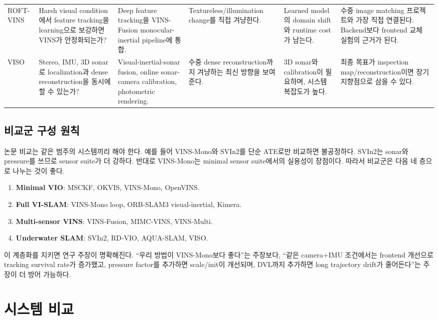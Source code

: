 \documentclass[11pt,a4paper]{article}
\begin{document}
\begin{landscape}
\begin{longtable}{p{29mm}p{34mm}p{38mm}p{42mm}p{42mm}p{44mm}}
ROFT-VINS \cite{park2026roftvins}
& Harsh visual condition에서 feature tracking을 learning으로 보강하면 VINS가 안정화되는가?
& Deep feature tracking을 VINS-Fusion monocular-inertial pipeline에 통합.
& Textureless/illumination change를 직접 겨냥한다.
& Learned model의 domain shift와 runtime cost가 남는다.
& 수중 image matching 프로젝트와 가장 직접 연결된다. Backend보다 frontend 교체 실험의 근거가 된다. \\

VISO \cite{liu2026viso}
& Stereo, IMU, 3D sonar로 localization과 dense reconstruction을 동시에 할 수 있는가?
& Visual-inertial-sonar fusion, online sonar-camera calibration, photometric rendering.
& 수중 dense reconstruction까지 겨냥하는 최신 방향을 보여준다.
& 3D sonar와 calibration이 필요하며, 시스템 복잡도가 높다.
& 최종 목표가 inspection map/reconstruction이면 장기 지향점으로 삼을 수 있다. \\
\end{longtable}
\end{landscape}

\subsection{비교군 구성 원칙}

논문 비교는 같은 범주의 시스템끼리 해야 한다.
예를 들어 VINS-Mono와 SVIn2를 단순 ATE로만 비교하면 불공정하다.
SVIn2는 sonar와 pressure를 쓰므로 sensor suite가 더 강하다.
반대로 VINS-Mono는 minimal sensor suite에서의 실용성이 장점이다.
따라서 비교군은 다음 네 층으로 나누는 것이 좋다.

\begin{enumerate}
  \item \textbf{Minimal VIO}: MSCKF, OKVIS, VINS-Mono, OpenVINS.
  \item \textbf{Full VI-SLAM}: VINS-Mono loop, ORB-SLAM3 visual-inertial, Kimera.
  \item \textbf{Multi-sensor VINS}: VINS-Fusion, MIMC-VINS, VINS-Multi.
  \item \textbf{Underwater SLAM}: SVIn2, RD-VIO, AQUA-SLAM, VISO.
\end{enumerate}

이 계층화를 지키면 연구 주장이 명확해진다.
``우리 방법이 VINS-Mono보다 좋다''는 주장보다, ``같은 camera+IMU 조건에서는 frontend 개선으로 tracking survival rate가 증가했고, pressure factor를 추가하면 scale/init이 개선되며, DVL까지 추가하면 long trajectory drift가 줄어든다''는 주장이 더 방어 가능하다.

\section{시스템 비교}
\end{document}

